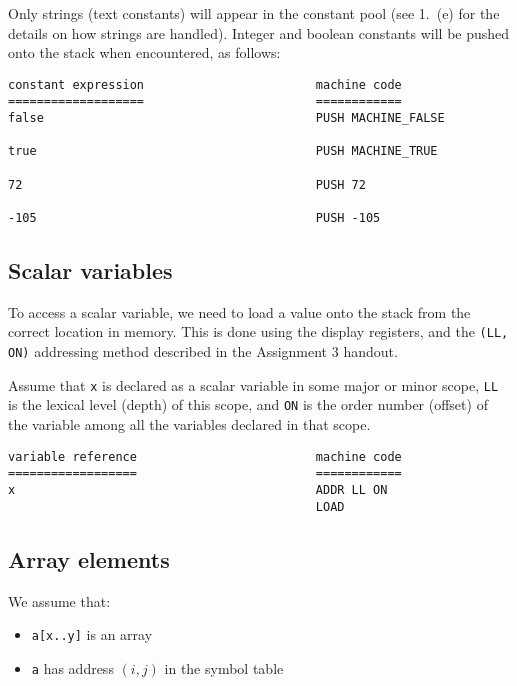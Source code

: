 \documentclass[11pt]{article}
\begin{document}
Only strings (text constants) will appear in the constant pool (see 1.\ (e) for the details on how strings are handled). Integer and boolean constants will be pushed onto the stack when encountered, as follows:

\begin{verbatim}
constant expression                        machine code
===================                        ============
false                                      PUSH MACHINE_FALSE

true                                       PUSH MACHINE_TRUE

72                                         PUSH 72

-105                                       PUSH -105
\end{verbatim}

\subsection{Scalar variables}

To access a scalar variable, we need to load a value onto the stack from the correct location in memory. This is done using the display registers, and the \texttt{(LL, ON)} addressing method described in the Assignment 3 handout.

Assume that \texttt{x} is declared as a scalar variable in some major or minor scope, \texttt{LL} is the lexical level (depth) of this scope, and \texttt{ON} is the order number (offset) of the variable among all the variables declared in that scope.

\begin{verbatim}
variable reference                         machine code
==================                         ============
x                                          ADDR LL ON
                                           LOAD
\end{verbatim}

\subsection{Array elements}

We assume that:
\begin{itemize}
    \item \texttt{a[x..y]} is an array
    \item \texttt{a} has address $(i, j)$ in the symbol table
\end{itemize}
\end{document}
